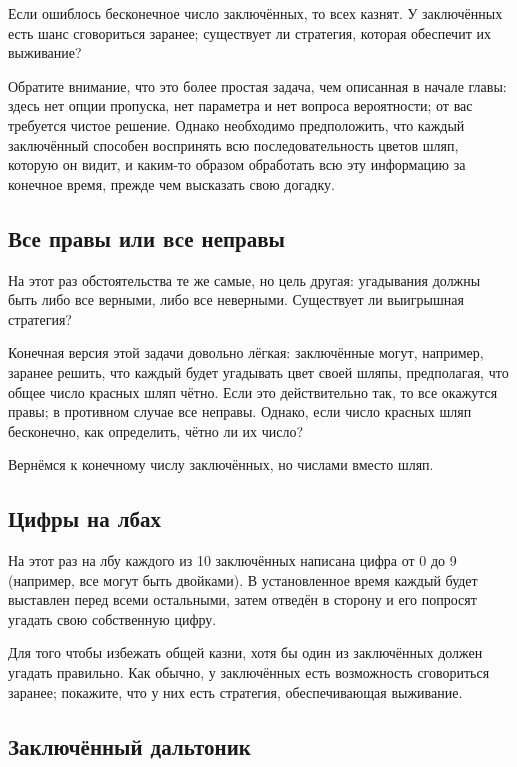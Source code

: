 Если ошиблось бесконечное число заключённых, то всех казнят. 
У заключённых есть шанс сговориться заранее;
существует ли стратегия, которая обеспечит их выживание?

Обратите внимание, что это более простая задача, чем описанная в начале главы: здесь нет опции пропуска, нет параметра и нет вопроса вероятности;
от вас требуется чистое решение.
Однако необходимо предположить, что каждый заключённый способен воспринять всю последовательность цветов шляп, которую он видит, и каким-то образом обработать всю эту информацию за конечное время, прежде чем высказать свою догадку.

\subsection*{Все правы или все неправы}

На этот раз обстоятельства те же самые, но цель другая:
угадывания должны быть либо все верными, либо все неверными.
Существует ли выигрышная стратегия?

Конечная версия этой задачи довольно лёгкая:
заключённые могут, например, заранее решить, что каждый будет угадывать цвет своей шляпы, предполагая, что общее число красных шляп чётно.
Если это действительно так, то все окажутся правы;
в противном случае все неправы.
Однако, если число красных шляп бесконечно, как определить, чётно ли их число?

\medskip

Вернёмся к конечному числу заключённых, но числами вместо шляп.

\subsection*{Цифры на лбах}

На этот раз на лбу каждого из 10 заключённых написана цифра от 0 до 9 (например, все могут быть двойками).
В установленное время каждый будет выставлен перед всеми остальными, затем отведён в сторону и его попросят угадать свою собственную цифру.

Для того чтобы избежать общей казни, хотя бы один из заключённых должен угадать правильно.
Как обычно, у заключённых есть возможность сговориться заранее;
покажите, что у них есть стратегия, обеспечивающая выживание.

\subsection*{Заключённый дальтоник}

